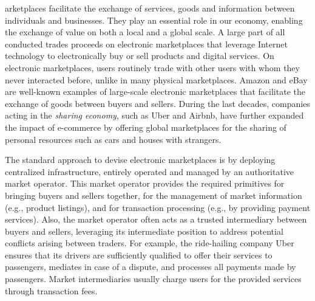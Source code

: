 arketplaces facilitate the exchange of services, goods and information between individuals and businesses.
They play an essential role in our economy, enabling the exchange of value on both a local and a global scale.
A large part of all conducted trades proceeds on electronic marketplaces that leverage Internet technology to electronically buy or sell products and digital services.
On electronic marketplaces, users routinely trade with other users with whom they never interacted before, unlike in many physical marketplaces.
Amazon and eBay are well-known examples of large-scale electronic marketplaces that facilitate the exchange of goods between buyers and sellers.
During the last decades, companies acting in the \emph{sharing economy}, such as Uber and Airbnb, have further expanded the impact of e-commerce by offering global marketplaces for the sharing of personal resources such as cars and houses with strangers.


The standard approach to devise electronic marketplaces is by deploying centralized infrastructure, entirely operated and managed by an authoritative market operator.
This market operator provides the required primitives for bringing buyers and sellers together, for the management of market information (e.g., product listings), and for transaction processing (e.g., by providing payment services).
Also, the market operator often acts as a trusted intermediary between buyers and sellers, leveraging its intermediate position to address potential conflicts arising between traders.
For example, the ride-hailing company Uber ensures that its drivers are sufficiently qualified to offer their services to passengers, mediates in case of a dispute, and processes all payments made by passengers.
Market intermediaries usually charge users for the provided services through transaction fees.

